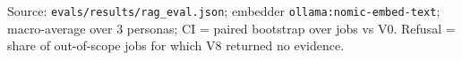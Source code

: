Source: \texttt{evals/results/rag\_eval.json}; embedder \texttt{ollama:nomic-embed-text}; macro-average over 3 personas; CI = paired bootstrap over jobs vs V0. Refusal = share of out-of-scope jobs for which V8 returned no evidence.
